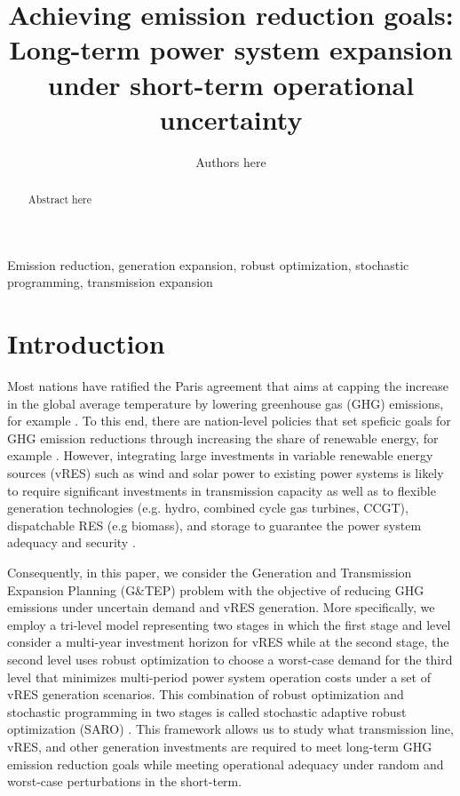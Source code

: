 \documentclass[final]{IEEEtran}
\begin{document}
\title{Achieving emission reduction goals: Long-term power system expansion under short-term operational uncertainty}
\author{Authors here}
\maketitle

\begin{abstract}
Abstract here
\end{abstract}
\begin{IEEEkeywords}
Emission reduction, generation expansion, robust optimization, stochastic programming, transmission expansion
\end{IEEEkeywords}

\section{Introduction}


Most nations have ratified the Paris agreement that aims at capping the increase in the global average temperature by lowering greenhouse gas (GHG) emissions, for example \cite{Paris_agreement}. To this end, there are nation-level policies that set speficic goals for GHG emission reductions through increasing the share of renewable energy, for example \cite{EU_climate_action}. However, integrating large investments in variable renewable energy sources (vRES) such as wind and solar power to existing power systems is likely to require significant investments in transmission capacity as well as to flexible generation technologies (e.g. hydro, combined cycle gas turbines, CCGT), dispatchable RES (e.g biomass), and storage to guarantee the power system adequacy and security \cite{Zappa}.

Consequently, in this paper, we consider the Generation and Transmission Expansion Planning (G\&TEP) problem with the objective of reducing GHG emissions under uncertain demand and vRES generation. More specifically, we employ a tri-level model representing two stages in which the first stage and level consider a multi-year investment horizon for vRES while at the second stage, the second level uses robust optimization to choose a worst-case demand for the third level that minimizes multi-period power system operation costs under a set of vRES generation scenarios. This combination of robust optimization and stochastic programming in two stages is called stochastic adaptive robust optimization (SARO) \cite{Baringo2018}. This framework allows us to study what transmission line, vRES, and other generation investments are required to meet long-term GHG emission reduction goals while meeting operational adequacy under random and worst-case perturbations in the short-term.
\end{document}
